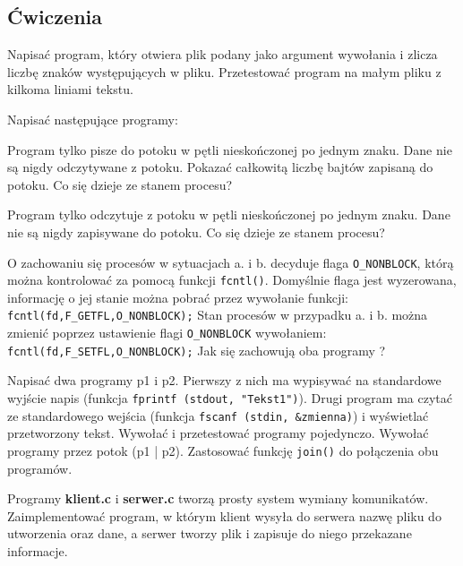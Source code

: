 \subsection{Ćwiczenia}
\label{sec:T9O59}

\begin{myenumerate}
  \item Napisać program, który otwiera plik podany jako argument wywołania i
    zlicza liczbę znaków występujących w pliku. Przetestować program na małym
    pliku z kilkoma liniami tekstu.
  \item Napisać następujące programy:
    \begin{myenumerate}
      \item Program tylko pisze do potoku w pętli nieskończonej po jednym
        znaku. Dane nie są nigdy odczytywane z potoku. Pokazać całkowitą liczbę
        bajtów zapisaną do potoku. Co się dzieje ze stanem procesu?
      \item Program tylko odczytuje z potoku w pętli nieskończonej po jednym
        znaku. Dane nie są nigdy zapisywane do potoku. Co się dzieje ze stanem
        procesu?
      \item O zachowaniu się procesów w sytuacjach a. i b. decyduje flaga
        \texttt{O\_NONBLOCK}, którą można kontrolować za pomocą funkcji
        \texttt{fcntl()}. Domyślnie flaga jest wyzerowana, informację o jej
        stanie można pobrać przez wywołanie funkcji:
        \texttt{fcntl(fd,F\_GETFL,O\_NONBLOCK);} Stan procesów w przypadku a. i
        b. można zmienić poprzez ustawienie flagi \texttt{O\_NONBLOCK}
        wywołaniem: \texttt{fcntl(fd,F\_SETFL,O\_NONBLOCK);} Jak się
        zachowują oba programy ?
    \end{myenumerate}
    \item Napisać dwa programy p1 i p2. Pierwszy z nich ma wypisywać na
      standardowe wyjście napis (funkcja \texttt{fprintf (stdout, "Tekst1")}).
      Drugi program ma czytać ze standardowego wejścia (funkcja \texttt{fscanf
      (stdin, \&zmienna)}) i wyświetlać przetworzony tekst. Wywołać i przetestować
      programy pojedynczo. Wywołać programy przez potok (p1 | p2). Zastosować
      funkcję \texttt{join()} do połączenia obu programów.
    \item Programy \textbf{klient.c} i \textbf{serwer.c} tworzą prosty system
      wymiany komunikatów. Zaimplementować program, w którym klient wysyła do
      serwera nazwę pliku do utworzenia oraz dane, a serwer tworzy plik i
      zapisuje do niego przekazane informacje.
\end{myenumerate}

